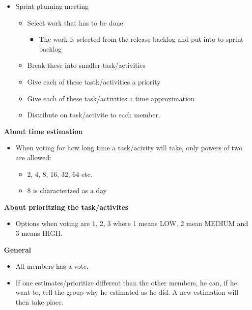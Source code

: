 \begin{framed}
\begin{itemize}
    \item Sprint planning meeting
    \begin{itemize}
        \item Select work that has to be done
        \begin{itemize}
            \item The work is selected from the release backlog and put into to
                sprint backlog
        \end{itemize}
        \item Break these into smaller task/activities
        \item Give each of these tastk/activities a priority 
        \item Give each of these task/activities a time approximation
        \item Distribute on task/activite to each member. 
    \end{itemize}
\end{itemize}

\textbf{About time estimation}
\begin{itemize}
    \item When voting for how long time a task/acivity will take, only powers of two are allowed:
        \begin{itemize}
            \item 2, 4, 8, 16, 32, 64 etc.
            \item 8 is characterized as a day
        \end{itemize}
\end{itemize}

\textbf{About prioritzing the task/activites}
\begin{itemize}
    \item Options when voting are 1, 2, 3 where 1 means LOW, 2 mean MEDIUM and
        3 means HIGH. 
\end{itemize}

\textbf{General}
\begin{itemize}
    \item All members has a vote. 
    \item If one estimates/prioritize different than the other members, he can,
        if he want to, tell the group why he estimated as
        he did. A new estimation will then take place.  
\end{itemize}
\end{framed}
